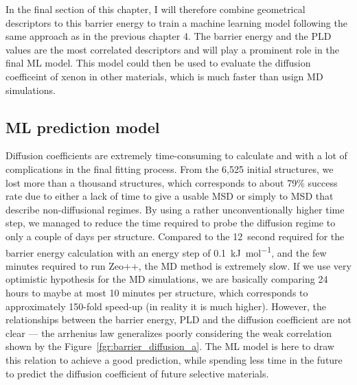 \documentclass[main]{subfiles}
\begin{document}
In the final section of this chapter, I will therefore combine geometrical descriptors to this barrier energy to train a machine learning model following the same approach as in the previous chapter 4. The barrier energy and the PLD values are the most correlated descriptors and will play a prominent role in the final ML model. This model could then be used to evaluate the diffusion coefficeint of xenon in other materials, which is much faster than usign MD simulations.

\subsection{ML prediction model}

Diffusion coefficients are extremely time-consuming to calculate and with a lot of complications in the final fitting process. From the 6,525 initial structures, we lost more than a thousand structures, which corresponds to about 79\% success rate due to either a lack of time to give a usable MSD or simply to MSD that describe non-diffusional regimes. By using a rather unconventionally higher time step, we managed to reduce the time required to probe the diffusion regime to only a couple of days per structure. Compared to the \SI{12}{second} required for the barrier energy calculation with an energy step of \SI{0.1}{\kJ\per\mol}, and the few minutes required to run Zeo++, the MD method is extremely slow. If we use very optimistic hypothesis for the MD simulations, we are basically comparing 24 hours to maybe at most 10 minutes per structure, which corresponds to approximately 150-fold speed-up (in reality it is much higher). However, the relationships between the barrier energy, PLD and the diffusion coefficient are not clear --- the arrhenius law generalizes poorly considering the weak correlation shown by the Figure~\ref{fgr:barrier_diffusion_a}. The ML model is here to draw this relation to achieve a good prediction, while spending less time in the future to predict the diffusion coefficient of future selective materials.
\end{document}
